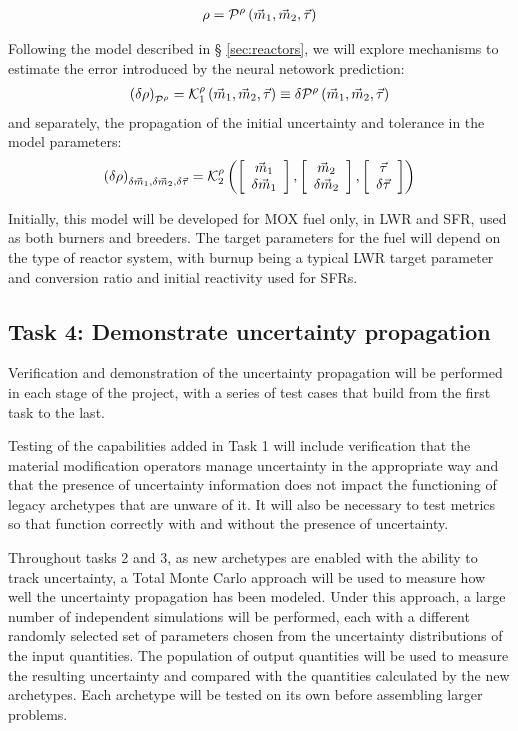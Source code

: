 \documentclass[dvips,12pt]{article}
\newcommand{\unc}[1]
{ \delta #1 }
\newcommand{\uncvector}[1]
{ \left[ \begin{array}{c} #1 \\ \delta #1 \end{array} \right] }
\begin{document}
\begin{align}
  \rho = {\cal P}^{\rho}\left( \vec{m}_{1},\vec{m}_{2}, \vec{\tau} \right)
\end{align}

Following the model described in \S
\ref{sec:reactors}, we will explore mechanisms to
estimate the error introduced by the neural
netowork prediction:
\begin{align}
  \left(\unc{\rho}\right)_{\cal P^\rho} = {\cal K}_1^{\rho}\left( \vec{m}_{1},\vec{m}_{2}, \vec{\tau} \right) \equiv \delta {\cal P}^\rho\left( \vec{m}_{1},\vec{m}_{2}, \vec{\tau} \right)
\end{align}
and separately, the propagation of the initial uncertainty and tolerance in the model parameters:
\begin{align}
  \left(\unc{\rho}\right)_{\unc{\vec{m}_{1}},\unc{\vec{m}_{2}},\unc{\vec{\tau}}} = {\cal K}^{\rho}_2\left( \uncvector{\vec{m}_{1}},\uncvector{\vec{m}_{2}}, \uncvector{\vec{\tau}} \right)
\end{align}

Initially, this model will be developed for MOX
fuel only, in LWR and SFR, used as both burners
and breeders.  The target parameters for the fuel
will depend on the type of reactor system, with
burnup being a typical LWR target parameter and
conversion ratio and initial reactivity used for
SFRs.

\subsection{Task 4: Demonstrate uncertainty propagation}

Verification and demonstration of the uncertainty
propagation will be performed in each stage of the
project, with a series of test cases that build
from the first task to the last.

Testing of the capabilities added in Task 1 will
include verification that the material
modification operators manage uncertainty in the
appropriate way and that the presence of
uncertainty information does not impact the
functioning of legacy archetypes that are unware
of it.  It will also be necessary to test metrics
so that function correctly with and without the
presence of uncertainty.

Throughout tasks 2 and 3, as new archetypes are
enabled with the ability to track uncertainty, a
Total Monte Carlo approach will be used to measure
how well the uncertainty propagation has been
modeled.  Under this approach, a large number of
independent simulations will be performed, each
with a different randomly selected set of
parameters chosen from the uncertainty
distributions of the input quantities.  The
population of output quantities will be used to
measure the resulting uncertainty and compared
with the quantities calculated by the new
archetypes.  Each archetype will be tested on its
own before assembling larger problems.
\end{document}
